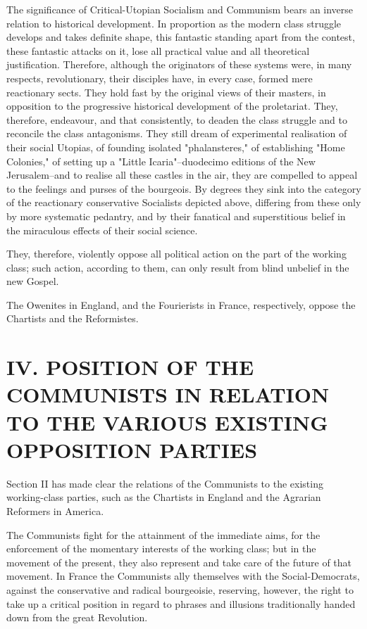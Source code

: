 \documentclass[11pt]{book}
\begin{document}
The significance of Critical-Utopian Socialism and Communism
bears an inverse relation to historical development.  In
proportion as the modern class struggle develops and takes
definite shape, this fantastic standing apart from the contest,
these fantastic attacks on it, lose all practical value and all
theoretical justification.  Therefore, although the originators
of these systems were, in many respects, revolutionary, their
disciples have, in every case, formed mere reactionary sects.
They hold fast by the original views of their masters, in
opposition to the progressive historical development of the
proletariat.  They, therefore, endeavour, and that consistently,
to deaden the class struggle and to reconcile the class antagonisms.
They still dream of experimental realisation of their social
Utopias, of founding isolated "phalansteres," of establishing
"Home Colonies,"  of setting up a "Little Icaria"--duodecimo
editions of the New Jerusalem--and to realise all these castles
in the air, they are compelled to appeal to the feelings and
purses of the bourgeois.  By degrees they sink into the category
of the reactionary conservative Socialists depicted above,
differing from these only by more systematic pedantry, and
by their fanatical and superstitious belief in the miraculous
effects of their social science.

They, therefore, violently oppose all political action on the
part of the working class; such action, according to them, can
only result from blind unbelief in the new Gospel.

The Owenites in England, and the Fourierists in France,
respectively, oppose the Chartists and the Reformistes.



\chapter*{IV.  POSITION OF THE COMMUNISTS IN RELATION TO THE
VARIOUS EXISTING OPPOSITION PARTIES}

Section II has made clear the relations of the Communists to the
existing working-class parties, such as the Chartists in England
and the Agrarian Reformers in America.

The Communists fight for the attainment of the immediate aims,
for the enforcement of the momentary interests of the working
class; but in the movement of the present, they also represent
and take care of the future of that movement.  In France the
Communists ally themselves with the Social-Democrats, against the
conservative and radical bourgeoisie, reserving, however, the
right to take up a critical position in regard to phrases and
illusions traditionally handed down from the great Revolution.
\end{document}
